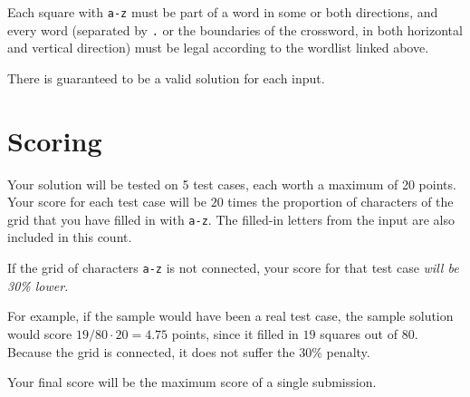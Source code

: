 Each square with \texttt{a-z} must be part of a word in some or both directions,
and every word (separated by \texttt{.} or the boundaries of the crossword, in both
horizontal and vertical direction) must be legal according to the wordlist
linked above.

There is guaranteed to be a valid solution for each input.

\section*{Scoring}
Your solution will be tested on 5 test cases, each worth a maximum of 20 points.
Your score for each test case will be $20$ times the proportion of characters
of the grid that you have filled in with \texttt{a-z}.
The filled-in letters from the input are also included in this count.

If the grid of characters \texttt{a-z} is not connected, your score for that test case \emph{will be 30\% lower}.

For example, if the sample would have been a real test case, the sample solution
would score $19 / 80 \cdot 20 = 4.75$ points, since it filled in $19$ squares out of $80$.
Because the grid is connected, it does not suffer the 30\% penalty.

Your final score will be the maximum score of a single submission.
